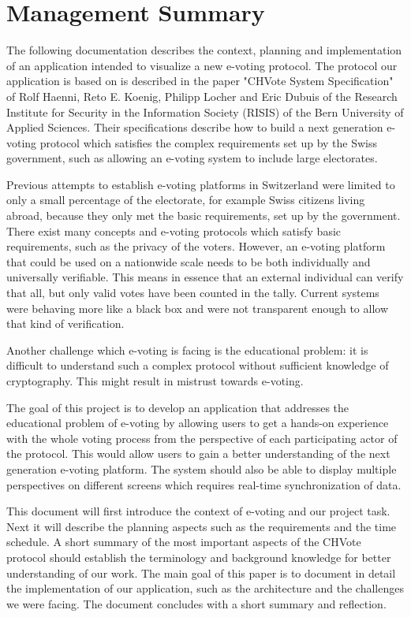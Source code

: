 \chapter*{Management Summary}
The following documentation describes the context, planning and implementation of an application intended to visualize a new e-voting protocol. The protocol our application is based on is described in the paper "{}CHVote System Specification"{} of Rolf Haenni, Reto E. Koenig, Philipp Locher and Eric Dubuis of the Research Institute for Security in the Information Society (RISIS) of the Bern University of Applied Sciences. Their specifications describe how to build a next generation e-voting protocol which satisfies the complex requirements set up by the Swiss government, such as allowing an e-voting system to include large electorates.

Previous attempts to establish e-voting platforms in Switzerland were limited to only a small percentage of the electorate, for example Swiss citizens living abroad, because they only met the basic requirements, set up by the government. There exist many concepts and e-voting protocols which satisfy basic requirements, such as the privacy of the voters. However, an e-voting platform that could be used on a nationwide scale needs to be both individually and universally verifiable. This means in essence that an external individual can verify that all, but only valid votes have been counted in the tally. Current systems were behaving more like a black box and were not transparent enough to allow that kind of verification.

Another challenge which e-voting is facing is the educational problem: it is difficult to understand such a complex protocol without sufficient knowledge of cryptography. This might result in mistrust towards e-voting.

The goal of this project is to develop an application that addresses the educational problem of e-voting by allowing users to get a hands-on experience with the whole voting process from the perspective of each participating actor of the protocol. This would allow users to gain a better understanding of the next generation e-voting platform. The system should also be able to display multiple perspectives on different screens which requires real-time synchronization of data.

This document will first introduce the context of e-voting and our project task. Next it will describe the planning aspects such as the requirements and the time schedule. A short summary of the most important aspects of the CHVote protocol should establish the terminology and background knowledge for better understanding of our work. The main goal of this paper is to document in detail the implementation of our application, such as the architecture and the challenges we were facing. The document concludes with a short summary and reflection.
